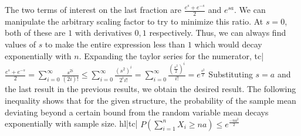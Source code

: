 The two terms of interest on the last fraction are \(\frac{e^s+e^{-s}}{2}\) and \(e^{sa}\). We can manipulate the arbitrary scaling factor to try to minimize this ratio. At \(s=0\), both of these are \(1\) with derivatives \(0,1\) respectively. Thus, we can always find values of \(s\) to make the entire expression less than \(1\) which would decay exponentially with \(n\).
Expanding the taylor series for the numerator,
tc| \( \frac{e^s+e^{-s}}{2} = \sum_{i=0}^\infty \frac{s^{2i}}{(2i)!} \le \sum_{i=0}^\infty \frac{\left(s^2\right)^i}{2^ii!} = \sum_{i=0}^\infty \frac{\left(\frac{s^2}{2}\right)^i}{i!} = e^\frac{s^2}{2}\)
Substituting \(s=a\) and the last result in the previous results, we obtain the desired result. The following inequality shows that for the given structure, the probability of the sample mean deviating beyond a certain bound from the random variable mean decays exponentially with sample size.
hl|tc| \( P(\sum_{i=1}^n X_i \ge na) \le e^{\frac{-na^2}{2}} \)